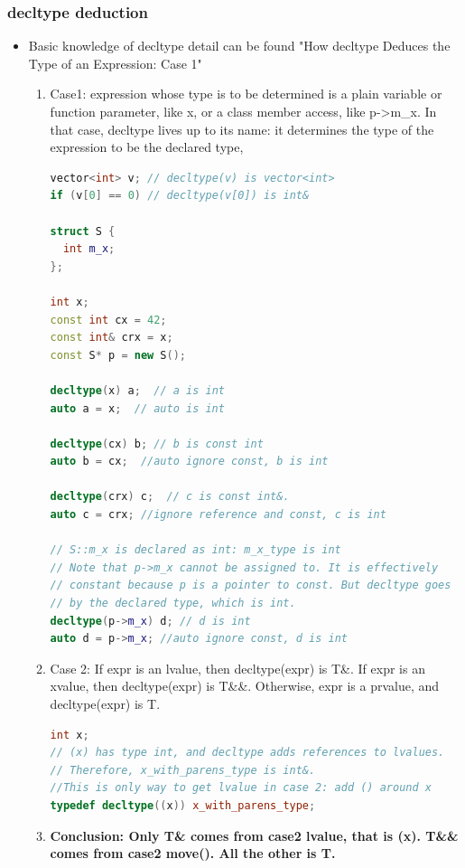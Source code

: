 \documentclass[a4paper,12pt,twoside]{book}
\begin{document}
\subsubsection{decltype deduction}
\begin{itemize}
\item Basic knowledge of decltype detail can be found "How decltype Deduces the Type of an Expression: Case 1"
\begin{enumerate}
\item Case1: expression whose type is to be determined is a plain variable or function parameter, like x, or a class member access, like p->m\_x. In that case, decltype lives up to its name: it determines the type of the expression to be the declared type,
\begin{lstlisting}[frame=single, language=c++]
vector<int> v; // decltype(v) is vector<int>
if (v[0] == 0) // decltype(v[0]) is int&

struct S {
  int m_x;
};

int x;
const int cx = 42;
const int& crx = x;
const S* p = new S();

decltype(x) a;  // a is int
auto a = x;  // auto is int

decltype(cx) b; // b is const int
auto b = cx;  //auto ignore const, b is int

decltype(crx) c;  // c is const int&.
auto c = crx; //ignore reference and const, c is int

// S::m_x is declared as int: m_x_type is int
// Note that p->m_x cannot be assigned to. It is effectively
// constant because p is a pointer to const. But decltype goes
// by the declared type, which is int.
decltype(p->m_x) d; // d is int
auto d = p->m_x; //auto ignore const, d is int
\end{lstlisting}

\item Case 2: If expr is an lvalue, then decltype(expr) is T\&. If expr is an xvalue, then decltype(expr) is T\&\&. Otherwise, expr is a prvalue, and decltype(expr) is T.

\begin{lstlisting}[frame=single, language=c++]
int x;
// (x) has type int, and decltype adds references to lvalues.
// Therefore, x_with_parens_type is int&.
//This is only way to get lvalue in case 2: add () around x
typedef decltype((x)) x_with_parens_type;
\end{lstlisting}
\item \textbf{Conclusion: Only T\& comes from case2 lvalue, that is (x). T\&\& comes from case2 move().  All the other is T.}
\end{enumerate}


\end{itemize}
\end{document}
